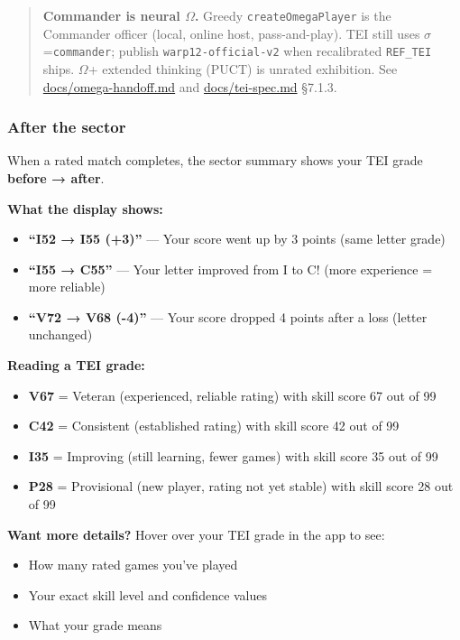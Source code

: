 \documentclass[11pt]{article}
\providecommand{\tightlist}{%
  \setlength{\itemsep}{0pt}\setlength{\parskip}{0pt}}
\begin{document}
\begin{quote}
\textbf{Commander is neural $\Omega$.} Greedy \texttt{createOmegaPlayer} is the
Commander officer (local, online host, pass-and-play). TEI still uses
$\sigma$=\texttt{commander}; publish \texttt{warp12-official-v2} when
recalibrated \texttt{REF\_TEI} ships. $\Omega$+ extended thinking (PUCT) is
unrated exhibition. See \url{docs/omega-handoff.md} and
\url{docs/tei-spec.md} §7.1.3.
\end{quote}

\subsubsection{After the sector}\label{after-the-sector}

When a rated match completes, the sector summary shows your TEI grade \textbf{before → after}. 

\textbf{What the display shows:}
\begin{itemize}
\tightlist
\item
  \textbf{``I52 → I55 (+3)''} --- Your score went up by 3 points (same letter grade)
\item
  \textbf{``I55 → C55''} --- Your letter improved from I to C! (more experience = more reliable)
\item
  \textbf{``V72 → V68 (-4)''} --- Your score dropped 4 points after a loss (letter unchanged)
\end{itemize}

\textbf{Reading a TEI grade:}
\begin{itemize}
\tightlist
\item
  \textbf{V67} = Veteran (experienced, reliable rating) with skill score 67 out of 99
\item
  \textbf{C42} = Consistent (established rating) with skill score 42 out of 99
\item
  \textbf{I35} = Improving (still learning, fewer games) with skill score 35 out of 99
\item
  \textbf{P28} = Provisional (new player, rating not yet stable) with skill score 28 out of 99
\end{itemize}

\textbf{Want more details?} Hover over your TEI grade in the app to see:
\begin{itemize}
\tightlist
\item
  How many rated games you've played
\item
  Your exact skill level and confidence values
\item
  What your grade means
\end{itemize}
\end{document}
